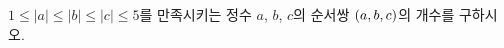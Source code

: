 $1\le|a|\le|b|\le|c|\le5$를 만족시키는 정수 $a$, $b$, $c$의 순서쌍 $(a{,}\mkern3mu\mathopen{}b{,}\mkern3mu\mathopen{}c)$의 개수를 구하시오.
